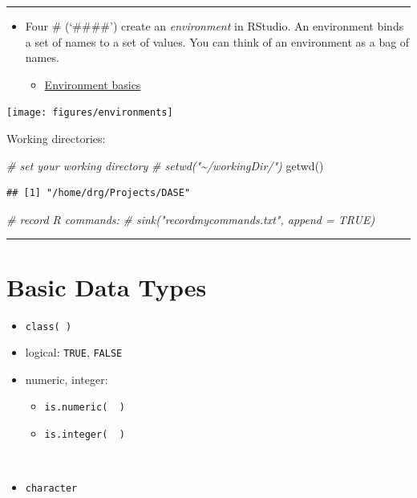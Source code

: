 \documentclass[
]{book}
\newenvironment{Shaded}{\begin{snugshade}}{\end{snugshade}}
\newcommand{\CommentTok}[1]{\textcolor[rgb]{0.56,0.35,0.01}{\textit{#1}}}
\newcommand{\FunctionTok}[1]{\textcolor[rgb]{0.00,0.00,0.00}{#1}}
\newcommand{\NormalTok}[1]{#1}
\providecommand{\tightlist}{%
  \setlength{\itemsep}{0pt}\setlength{\parskip}{0pt}}
\begin{document}
\begin{center}\rule{0.5\linewidth}{0.5pt}\end{center}

\begin{itemize}
\item
  Four \# (`\#\#\#\#') create an \emph{environment} in RStudio. An environment binds a set of names to a set of values. You can think of an environment as a bag of names.

  \begin{itemize}
  \tightlist
  \item
    \href{http://adv-r.had.co.nz/Environments.html\#env-basics}{Environment basics}
  \end{itemize}
\end{itemize}

\texttt{[image: figures/environments]}

Working directories:

\begin{Shaded}
\begin{Highlighting}[]
\CommentTok{\# set your working directory}
\CommentTok{\# setwd("\textasciitilde{}/workingDir/")}
\FunctionTok{getwd}\NormalTok{()}
\end{Highlighting}
\end{Shaded}

\begin{verbatim}
## [1] "/home/drg/Projects/DASE"
\end{verbatim}

\begin{Shaded}
\begin{Highlighting}[]
\CommentTok{\# record R commands:}
\CommentTok{\# sink("recordmycommands.txt", append = TRUE)}
\end{Highlighting}
\end{Shaded}

\begin{center}\rule{0.5\linewidth}{0.5pt}\end{center}

\hypertarget{basic-data-types}{%
\section{Basic Data Types}\label{basic-data-types}}

\begin{itemize}
\item
  \texttt{class(\ )}
\item
  logical: \texttt{TRUE}, \texttt{FALSE}
\item
  numeric, integer:

  \begin{itemize}
  \tightlist
  \item
    \texttt{is.numeric(\ \ )}
  \item
    \texttt{is.integer(\ \ )}\strut \\
  \end{itemize}
\item
  \texttt{character}
\end{itemize}
\end{document}
